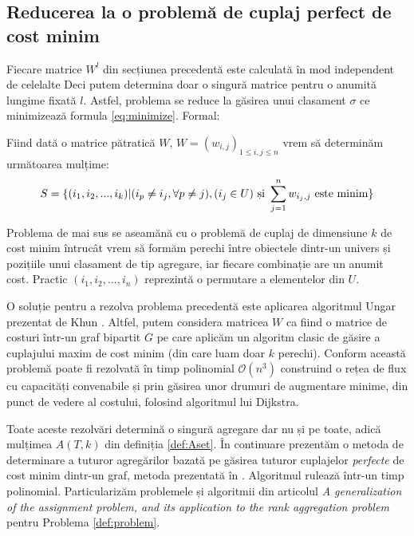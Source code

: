 \subsection{Reducerea la o problemă de cuplaj perfect de cost minim}
Fiecare matrice $W^l$ din secțiunea precedentă este calculată în mod independent de celelalte
Deci putem determina doar o singură matrice pentru o anumită lungime fixată $l$. 
Astfel, problema se reduce la găsirea unui clasament $\sigma$ ce 
minimizează formula \eqref{eq:minimize}. Formal:

\begin{problem}
\label{def:problem}
Fiind dată o matrice pătratică $W$, $W = (w_{i, j})_{1 \leqslant i,j \leqslant n}$ vrem să
determinăm următoarea mulțime:
\[
  S = \{(i_1, i_2, ..., i_k) | (i_p \neq i_j, \forall p \neq j), (i_j \in U) \text{ și } \smashoperator{\sum_{j=1}^n} w_{i_j, j} \text{ este minim}\}
\]
\end{problem}

Problema de mai sus se aseamănă cu o problemă de cuplaj de dimensiune $k$ de cost minim întrucât 
vrem să formăm perechi între obiectele dintr-un univers și pozițiile unui clasament de tip agregare, 
iar fiecare combinație are un anumit cost. Practic $(i_1, i_2, ..., i_n)$ reprezintă o permutare a 
elementelor din $U$.

O soluție pentru a rezolva problema precedentă este aplicarea algoritmul Ungar prezentat de Khun \cite{hungarianmethod}.
Altfel, putem considera matricea $W$ ca fiind o matrice de costuri într-un graf bipartit $G$ pe care
aplicăm un algoritm clasic de găsire a cuplajului maxim de cost minim (din care luam doar $k$ perechi). 
Conform \cite{flowassignment} această problemă poate fi rezolvată în timp polinomial 
$\mathcal{O}(n^3)$ construind o rețea de flux cu capacități convenabile și prin găsirea unor drumuri 
de augmentare minime, din punct de vedere al costului, folosind algoritmul lui Dijkstra\cite{dijkstra}.

Toate aceste rezolvări determină o singură agregare dar nu și pe toate, adică mulțimea $A(T, k)$ din
definiția \ref{def:Aset}. În continuare prezentăm o metoda de determinare a tuturor agregărilor 
bazată pe găsirea tuturor cuplajelor \textit{perfecte} de cost minim dintr-un graf, metoda 
prezentată în \cite{allmatchings}. Algoritmul rulează într-un timp polinomial. Particularizăm 
problemele și algoritmii din articolul  \textit{A generalization of the assignment problem, and its
application to the rank aggregation  problem} \cite{allmatchings} pentru Problema \ref{def:problem}.


